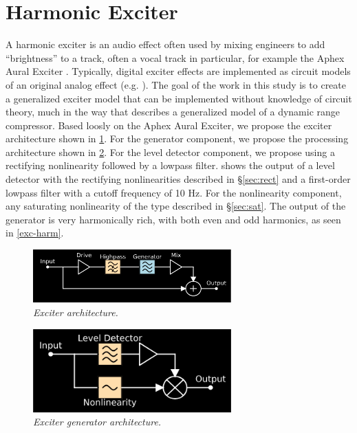 \documentclass[twoside,a4paper]{article}
\begin{document}
\section{Harmonic Exciter} \label{sec:exciter}
%
A harmonic exciter is an audio effect often used by mixing
engineers to add ``brightness'' to a track, often a vocal
track in particular, for example the Aphex Aural Exciter
\cite{aphex}. Typically, digital exciter effects are implemented
as circuit models of an original analog effect (e.g. \cite{exciter-model}).
The goal of the work in this study is to create a generalized exciter
model that can be implemented without knowledge of circuit theory,
much in the way that \cite{giannoulis2012digital} describes a
generalized model of a dynamic range compressor.
\newline\newline
Based loosly on the Aphex Aural Exciter, we propose the
exciter architecture shown in \cref{exc}. For the generator
component, we propose the processing architecture shown in
\cref{gen}.
\newline\newline
For the level detector component, we propose using a rectifying
nonlinearity followed by a lowpass filter.  shows the
output of a level detector with the rectifying nonlinearities described
in \S\ref{sec:rect} and a first-order lowpass filter with a cutoff
frequency of 10 Hz. For the nonlinearity component, any saturating
nonlinearity of the type described in \S\ref{sec:sat}. The output
of the generator is very harmonically rich, with both even and odd
harmonics, as seen in \cref{exc-harm}.
\newline\newline
%
\begin{figure}[h]
    \center
    \includegraphics[width=3in]{../Exciter/Pics/Exciter_FullArch.png}
    \caption{\label{exc}{\it Exciter architecture.}}
\end{figure}
%
\begin{figure}[h]
    \center
    \includegraphics[width=3in]{../Exciter/Pics/Exciter_Arch.png}
    \caption{\label{gen}{\it Exciter generator architecture.}}
\end{figure}
\end{document}
